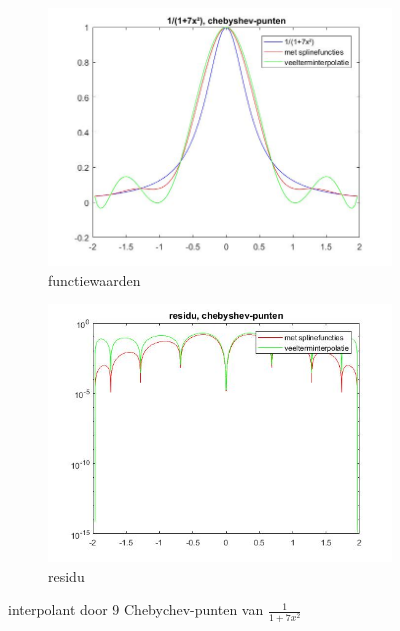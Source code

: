 \begin{figure}[H]
\centering
\begin{subfigure}{.5\textwidth}
  \centering
  \includegraphics[width=\linewidth]{afbeeldingen/rat_cheb.jpg}
  \caption{functiewaarden}
\end{subfigure}%
\begin{subfigure}{.5\textwidth}
  \centering
  \includegraphics[width=\linewidth]{afbeeldingen/rat_cheb_res.jpg}
  \caption{residu}
\end{subfigure}
\caption{interpolant door 9 Chebychev-punten van  $\frac{1}{1+7x^2}$}
\label{fig:ratcheb}
\end{figure}